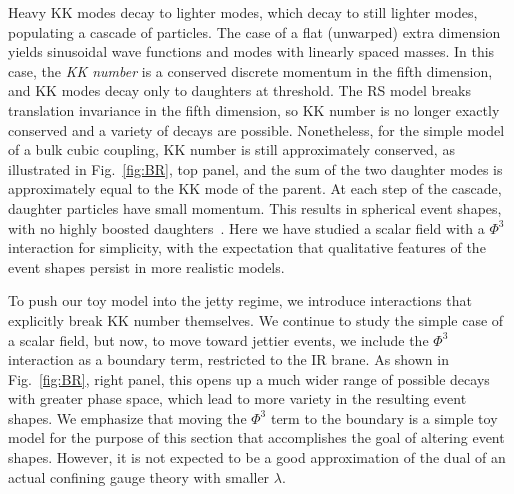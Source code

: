 Heavy KK modes decay to lighter modes, which decay to still lighter modes, populating a cascade of particles. The case of a flat (unwarped) extra dimension yields sinusoidal wave functions and modes with linearly spaced masses. In this case, the \emph{KK number} is a conserved discrete momentum in the fifth dimension, and KK modes decay only to daughters at threshold. The RS model breaks translation invariance in the fifth dimension, so KK number is no longer exactly conserved and a variety of decays are possible. Nonetheless, for the simple model of a bulk cubic coupling, KK number is still approximately conserved, as illustrated in Fig.~\ref{fig:BR}, top panel, and the sum of the two daughter modes is approximately equal to the KK mode of the parent. At each step of the cascade, daughter particles have small momentum. This results in spherical event shapes, with no highly boosted daughters~\cite{Csaki:2008dt}. Here we have studied a scalar field with a $\Phi^3$ interaction for simplicity, with the expectation that qualitative features of the event shapes persist in more realistic models.

To push our toy model into the jetty regime, we introduce interactions that explicitly break KK number themselves. We continue to study the simple case of a scalar field, but now, to move toward jettier events, we include the $\Phi^3$ interaction as a boundary term, restricted to the IR brane. As shown in Fig.~\ref{fig:BR}, right panel, this opens up a much wider range of possible decays with greater phase space, which lead to more variety in the resulting event shapes. We emphasize that moving the $\Phi^3$ term to the boundary is a simple toy model for the purpose of this section that accomplishes the goal of altering event shapes. However, it is not expected to be a good approximation of the dual of an actual confining gauge theory with smaller $\lambda$.

